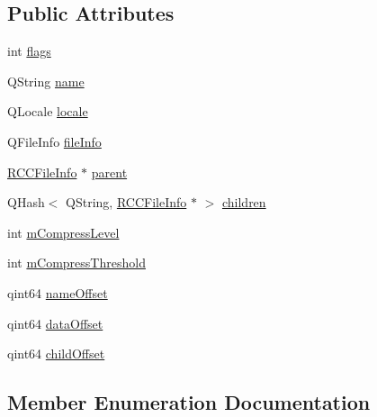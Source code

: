 \subsection*{Public Attributes}
\begin{DoxyCompactItemize}
\item 
int \hyperlink{structRCCFileInfo_a8a6bdf23979de163aa9e9636467d7248}{flags}
\item 
Q\+String \hyperlink{structRCCFileInfo_a3c1a9f04c22607ee67b95f5c98085f2a}{name}
\item 
Q\+Locale \hyperlink{structRCCFileInfo_a1e7756985c38cf9af35e74a0b56abbfb}{locale}
\item 
Q\+File\+Info \hyperlink{structRCCFileInfo_afc207131879f29502959baba420e7bb2}{file\+Info}
\item 
\hyperlink{structRCCFileInfo}{R\+C\+C\+File\+Info} $\ast$ \hyperlink{structRCCFileInfo_a7166e4c752fd8c2717850f7e230768dc}{parent}
\item 
Q\+Hash$<$ Q\+String, \hyperlink{structRCCFileInfo}{R\+C\+C\+File\+Info} $\ast$ $>$ \hyperlink{structRCCFileInfo_a10dc8d618749e88615fa59eb8458c3ce}{children}
\item 
int \hyperlink{structRCCFileInfo_ae404f409963d00682ba8e8a095e9f298}{m\+Compress\+Level}
\item 
int \hyperlink{structRCCFileInfo_af788fb19020d15af784472cc23fdcd04}{m\+Compress\+Threshold}
\item 
qint64 \hyperlink{structRCCFileInfo_ad7fee8ec6ccffe63604eff53ac9fa792}{name\+Offset}
\item 
qint64 \hyperlink{structRCCFileInfo_a32220afc0a8f6d6748c48caaaefedf37}{data\+Offset}
\item 
qint64 \hyperlink{structRCCFileInfo_aa6644ba7f6b72ef4fe80a9d0cf6f6e83}{child\+Offset}
\end{DoxyCompactItemize}


\subsection{Member Enumeration Documentation}
\hypertarget{structRCCFileInfo_a1d5fa2cb967921bbc17daec292388e8e}{}
